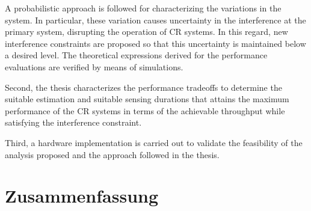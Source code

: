 A probabilistic approach is followed for characterizing the variations in the system. In particular, these variation causes uncertainty in the interference at the primary system, disrupting the operation of CR systems. In this regard, new interference constraints are proposed so that this uncertainty is maintained below a desired level. The theoretical expressions derived for the performance evaluations are verified by means of simulations. 




Second, the thesis characterizes the performance tradeoffs to determine the suitable estimation and suitable sensing durations that attains the maximum performance of the CR systems in terms of the achievable throughput while satisfying the interference constraint.  

Third, a hardware implementation is carried out to validate the feasibility of the analysis proposed and the approach followed in the thesis.  


\cleardoublepage
\chapter*{Zusammenfassung}


\cleardoublepage
